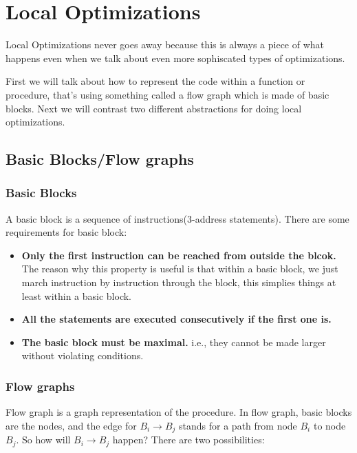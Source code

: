 \newpage
\section{Local Optimizations}

Local Optimizations never goes away because this is always a piece of what happens even when we 
talk about even more sophiscated types of optimizations.

First we will talk about how to represent the code within a function or procedure, that's using 
something called a flow graph which is made of basic blocks.  Next we will contrast two different 
abstractions for doing local optimizations.




\subsection{Basic Blocks/Flow graphs} 


\subsubsection{Basic Blocks}

A basic block is a sequence of instructions(3-address statements). There are some requirements for basic 
block:

\begin{itemize}
    \item \textbf{Only the first instruction can be reached from outside the blcok.} The reason why this property 
    is useful is that within a basic block, we just march instruction by instruction through the block, 
    this simplies things at least within a basic block.
    \item \textbf{All the statements are executed consecutively if the first one is.}
    \item \textbf{The basic block must be maximal.} i.e., they cannot be made larger without violating conditions. 
\end{itemize}


\subsubsection{Flow graphs}
Flow graph is a graph representation of the procedure. In flow graph, basic blocks are the nodes, and the edge for \(  B_i 
\rightarrow B_j \) stands for a path from node \( B_i \) to node \( B_j \). So how will \(  B_i  \rightarrow B_j \) happen? 
There are two possibilities:

